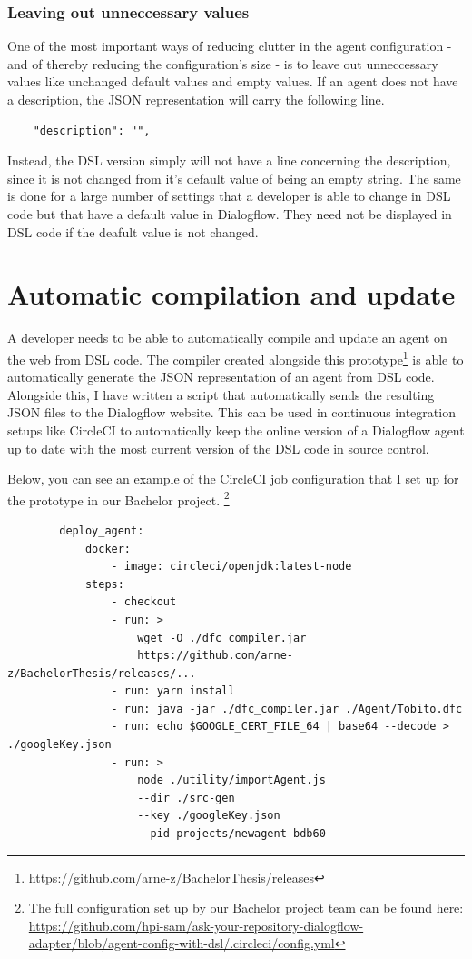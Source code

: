 \subsubsection{Leaving out unneccessary values}

One of the most important ways of reducing clutter in the agent configuration - and of thereby reducing the configuration's size - is to leave out unneccessary values like unchanged default values and empty values.
If an agent does not have a description, the JSON representation will carry the following line.
\begin{lstlisting}
    "description": "",
\end{lstlisting}
Instead, the DSL version simply will not have a line concerning the description, since it is not changed from it's default value of being an empty string.
The same is done for a large number of settings that a developer is able to change in DSL code but that have a default value in Dialogflow. They need not be displayed in DSL code if the deafult value is not changed.


\section{Automatic compilation and update}
A developer needs to be able to automatically compile and update an agent on the web from DSL code.
The compiler created alongside this prototype\footnote{\url{https://github.com/arne-z/BachelorThesis/releases}} is able to automatically generate the JSON representation of an agent from DSL code.
Alongside this, I have written a script that automatically sends the resulting JSON files to the Dialogflow website.
This can be used in continuous integration setups like CircleCI \cite{CircleCI} to automatically keep the online version of a Dialogflow agent up to date with the most current version of the DSL code in source control.

Below, you can see an example of the CircleCI job configuration that I set up for the prototype in our Bachelor project.
\footnote{The full configuration set up by our Bachelor project team can be found here:\\
\url{https://github.com/hpi-sam/ask-your-repository-dialogflow-adapter/blob/agent-config-with-dsl/.circleci/config.yml}}
\begin{samepage}    
    \begin{lstlisting}
        deploy_agent:
            docker:
                - image: circleci/openjdk:latest-node
            steps:
                - checkout
                - run: > 
                    wget -O ./dfc_compiler.jar
                    https://github.com/arne-z/BachelorThesis/releases/...
                - run: yarn install
                - run: java -jar ./dfc_compiler.jar ./Agent/Tobito.dfc
                - run: echo $GOOGLE_CERT_FILE_64 | base64 --decode > ./googleKey.json
                - run: >
                    node ./utility/importAgent.js 
                    --dir ./src-gen 
                    --key ./googleKey.json 
                    --pid projects/newagent-bdb60
    \end{lstlisting}
\end{samepage}

